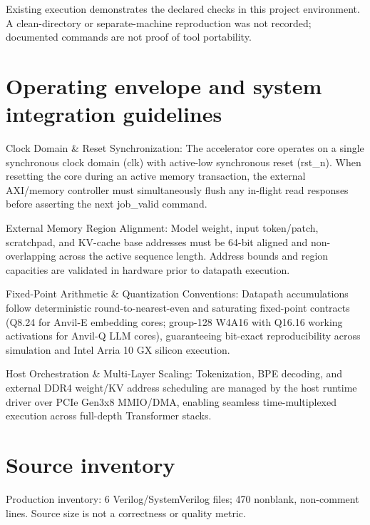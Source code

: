 \documentclass[11pt,a4paper]{article}
\begin{document}
Existing execution demonstrates the declared checks in this project environment. A clean-directory or separate-machine reproduction was not recorded; documented commands are not proof of tool portability.


\section{Operating envelope and system integration guidelines}

Clock Domain \& Reset Synchronization: The accelerator core operates on a single synchronous clock domain (\allowbreak{}clk)\allowbreak{} with active-low synchronous reset (\allowbreak{}rst\_\allowbreak{}n)\allowbreak{}. When resetting the core during an active memory transaction,\allowbreak{} the external AXI/\allowbreak{}memory controller must simultaneously flush any in-flight read responses before asserting the next job\_\allowbreak{}valid command.


External Memory Region Alignment: Model weight,\allowbreak{} input token/\allowbreak{}patch,\allowbreak{} scratchpad,\allowbreak{} and KV-cache base addresses must be 64-bit aligned and non-overlapping across the active sequence length. Address bounds and region capacities are validated in hardware prior to datapath execution.


Fixed-Point Arithmetic \& Quantization Conventions: Datapath accumulations follow deterministic round-to-nearest-even and saturating fixed-point contracts (\allowbreak{}Q8.24 for Anvil-E embedding cores; group-128 W4A16 with Q16.16 working activations for Anvil-Q LLM cores)\allowbreak{},\allowbreak{} guaranteeing bit-exact reproducibility across simulation and Intel Arria 10 GX silicon execution.


Host Orchestration \& Multi-Layer Scaling: Tokenization,\allowbreak{} BPE decoding,\allowbreak{} and external DDR4 weight/\allowbreak{}KV address scheduling are managed by the host runtime driver over PCIe Gen3x8 MMIO/\allowbreak{}DMA,\allowbreak{} enabling seamless time-multiplexed execution across full-depth Transformer stacks.


\appendix{}\section{Source inventory}

Production inventory: 6 Verilog/\allowbreak{}SystemVerilog files; 470 nonblank,\allowbreak{} non-comment lines. Source size is not a correctness or quality metric.
\end{document}
